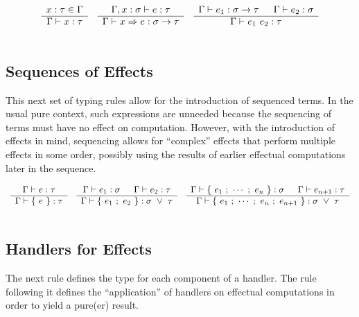 \documentclass{article}
\begin{document}
\[ \begin{array}{ccc}
  \begin{array}{c}  x:\tau \in \Gamma  \\ \hline  \Gamma \vdash x:\tau  \end{array}

   &

  \begin{array}{c}  \Gamma, x:\sigma \vdash e:\tau  \\ \hline \Gamma \vdash x \Rightarrow e : \sigma \rightarrow \tau  \end{array}

   &

  \begin{array}{c}  \Gamma \vdash e_1 : \sigma \rightarrow \tau \hspace{1.5em}
   \Gamma \vdash e_2 : \sigma  \\ \hline  \Gamma \vdash e_1 ~ e_2 : \tau  \end{array}

  \\\\
 \end{array} \]

\noindent
\subsection{Sequences of Effects}
This next set of typing rules allow for the introduction of sequenced terms.
In the usual pure context, such expressions are unneeded because the sequencing of terms
must have no effect on computation.
However, with the introduction of effects in mind, sequencing allows for ``complex'' effects
that perform multiple effects in some order, possibly using the results of earlier
effectual computations later in the sequence.

\[ \begin{array}{ccc}

  \begin{array}{c} 
   \Gamma \vdash e:\tau
   \\ \hline 
   \Gamma \vdash \{ ~ e ~ \} : \tau
   \end{array}

   &

  \begin{array}{c} 
   \Gamma \vdash e_1:\sigma \hspace{1.5em}
   \Gamma \vdash e_2:\tau
   \\ \hline 
   \Gamma \vdash \{ ~ e_1 ~ ; ~ e_2 ~ \} : \sigma ~ \lor ~ \tau
   \end{array}

   &

  \begin{array}{c} 
   \Gamma \vdash \{ ~ e_1 ~ ; ~ \cdots ~ ; ~ e_n ~ \} : \sigma \hspace{1.5em}
   \Gamma \vdash e_{n+1} : \tau
   \\ \hline 
   \Gamma \vdash \{ ~ e_1 ~ ; ~ \cdots ~ ; ~ e_n ~ ; ~ e_{n+1} ~ \}
   : \sigma ~ \lor ~ \tau
   \end{array}

  \\\\
 \end{array} \]

\noindent
\subsection{Handlers for Effects}
The next rule defines the type for each component of a handler.
The rule following it defines the ``application'' of handlers on
effectual computations in order to yield a pure(er) result.
\end{document}
